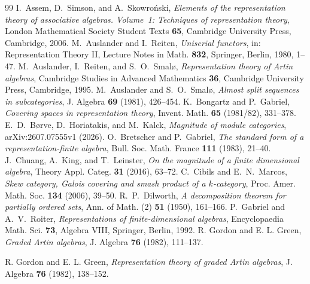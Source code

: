 \documentclass[a4paper,reqno,10pt]{amsart}
\theoremstyle{definition}
\numberwithin{equation}{section}
\begin{document}
\begin{thebibliography}{99}
I.~Assem, D.~Simson, and A.~Skowro\'nski,
\emph{Elements of the representation theory of associative algebras.
Volume~1: Techniques of representation theory},
London Mathematical Society Student Texts \textbf{65},
Cambridge University Press, Cambridge, 2006.
M.~Auslander and I.~Reiten,
\emph{Uniserial functors},
in: Representation Theory II, Lecture Notes in Math. \textbf{832},
Springer, Berlin, 1980, 1--47.
M.~Auslander, I.~Reiten, and S.~O.~Smal{\o},
\emph{Representation theory of Artin algebras},
Cambridge Studies in Advanced Mathematics \textbf{36},
Cambridge University Press, Cambridge, 1995.
M.~Auslander and S.~O.~Smal{\o},
\emph{Almost split sequences in subcategories},
J. Algebra \textbf{69} (1981), 426--454.
K.~Bongartz and P.~Gabriel,
\emph{Covering spaces in representation theory},
Invent. Math. \textbf{65} (1981/82), 331--378.
E.~D.~B{\o}rve, D.~Horiatakis, and M.~Kalck,
\emph{Magnitude of module categories},
arXiv:2607.07555v1 (2026).
O.~Bretscher and P.~Gabriel,
\emph{The standard form of a representation-finite algebra},
Bull. Soc. Math. France \textbf{111} (1983), 21--40.
J.~Chuang, A.~King, and T.~Leinster,
\emph{On the magnitude of a finite dimensional algebra},
Theory Appl. Categ. \textbf{31} (2016), 63--72.
C.~Cibils and E.~N.~Marcos,
\emph{Skew category, Galois covering and smash product of a
\(k\)-category},
Proc. Amer. Math. Soc. \textbf{134} (2006), 39--50.
R.~P.~Dilworth,
\emph{A decomposition theorem for partially ordered sets},
Ann. of Math. (2) \textbf{51} (1950), 161--166.
P.~Gabriel and A.~V.~Roiter,
\emph{Representations of finite-dimensional algebras},
Encyclopaedia Math. Sci. \textbf{73}, Algebra VIII, Springer, Berlin, 1992.
R. Gordon and E. L. Green, \emph{Graded Artin algebras},
J. Algebra \textbf{76} (1982), 111--137.

R. Gordon and E. L. Green, \emph{Representation theory of graded Artin algebras},
J. Algebra \textbf{76} (1982), 138--152.


\end{thebibliography}
\end{document}
